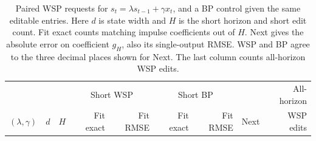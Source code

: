 \begin{table}[htbp]\centering\small\setlength{\tabcolsep}{3.4pt}
\caption{Paired WSP requests for $s_t=\lambda s_{t-1}+\gamma x_t$, and a BP control given the same editable entries. Here $d$ is state width and $H$ is the short horizon and short edit count. Fit exact counts matching impulse coefficients out of $H$. Next gives the absolute error on coefficient $g_H$, also its single-output RMSE. WSP and BP agree to the three decimal places shown for Next. The last column counts all-horizon WSP edits.}\label{tab:astra}
\begin{tabular}{@{}lrr rr rr rr@{}}\toprule
&&&\multicolumn{2}{c}{Short WSP}&\multicolumn{2}{c}{Short BP}&&All-horizon\\
$(\lambda,\gamma)$&$d$&$H$&Fit exact&Fit RMSE&Fit exact&Fit RMSE&Next&WSP edits\\\midrule
\end{tabular}\end{table}
